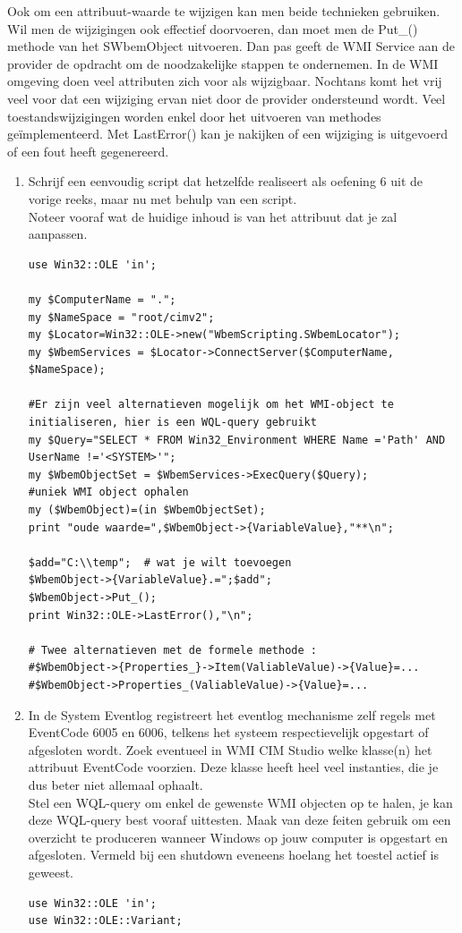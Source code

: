 \documentclass[11pt,a4paper]{report}
\begin{document}
Ook om een attribuut-waarde te wijzigen kan men beide technieken gebruiken. Wil men de wijzigingen ook effectief doorvoeren, dan moet men de Put\_() methode van het SWbemObject uitvoeren. Dan pas geeft de WMI Service aan de provider de opdracht om de noodzakelijke stappen te ondernemen. In de WMI omgeving doen veel attributen zich voor als wijzigbaar. Nochtans komt het vrij veel voor dat een wijziging ervan niet door de provider ondersteund wordt. Veel toestandswijzigingen worden enkel door het uitvoeren van methodes geïmplementeerd. Met LastError() kan je nakijken of een wijziging is uitgevoerd of een fout heeft gegenereerd.
\begin{enumerate}[resume]
	\item Schrijf een eenvoudig script dat hetzelfde realiseert als oefening 6 uit de vorige reeks, maar nu met behulp van een script.
	\\Noteer vooraf wat de huidige inhoud is van het attribuut dat je zal aanpassen.
	\begin{lstlisting}
use Win32::OLE 'in';

my $ComputerName = ".";
my $NameSpace = "root/cimv2";
my $Locator=Win32::OLE->new("WbemScripting.SWbemLocator");
my $WbemServices = $Locator->ConnectServer($ComputerName, $NameSpace);

#Er zijn veel alternatieven mogelijk om het WMI-object te initialiseren, hier is een WQL-query gebruikt
my $Query="SELECT * FROM Win32_Environment WHERE Name ='Path' AND UserName !='<SYSTEM>'";
my $WbemObjectSet = $WbemServices->ExecQuery($Query);
#uniek WMI object ophalen
my ($WbemObject)=(in $WbemObjectSet);
print "oude waarde=",$WbemObject->{VariableValue},"**\n";

$add="C:\\temp";  # wat je wilt toevoegen
$WbemObject->{VariableValue}.=";$add";
$WbemObject->Put_();
print Win32::OLE->LastError(),"\n";

# Twee alternatieven met de formele methode :
#$WbemObject->{Properties_}->Item(ValiableValue)->{Value}=...
#$WbemObject->Properties_(ValiableValue)->{Value}=...
	\end{lstlisting}
	\item In de System Eventlog registreert het eventlog mechanisme zelf regels met EventCode 6005 en 6006, telkens het systeem respectievelijk opgestart of afgesloten wordt. Zoek eventueel in WMI CIM Studio welke klasse(n) het attribuut EventCode voorzien. Deze klasse heeft heel veel instanties, die je dus beter niet allemaal ophaalt.
	\\Stel een WQL-query om enkel de gewenste WMI objecten op te halen, je kan deze WQL-query best vooraf uittesten.
	Maak van deze feiten gebruik om een overzicht te produceren wanneer Windows op jouw computer is opgestart en afgesloten. Vermeld bij een shutdown eveneens hoelang het toestel actief is geweest.
	\begin{lstlisting}
use Win32::OLE 'in';
use Win32::OLE::Variant;


\end{lstlisting}
\end{enumerate}
\end{document}
